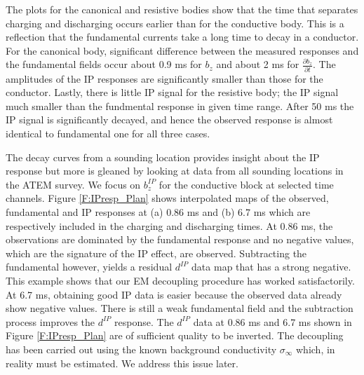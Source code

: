 \documentclass[a4paper, 11pt]{article}
\newcommand{\siginf}{\sigma_\infty}
\newcommand{\dip}{d^{IP}}
\begin{document}
The plots for the canonical and resistive bodies show that the time that separates charging and discharging occurs earlier than for the conductive body. This is a reflection that the fundamental currents take a long time to decay in a conductor. For the canonical body, significant difference between the measured responses and the fundamental fields occur about 0.9 ms for $b_z$ and about 2 ms for $\frac{\partial b_z}{\partial t}$. The amplitudes of the IP responses are significantly smaller than those for the conductor.  Lastly, there is little IP signal for the resistive body; the IP signal much smaller than the fundmental response in given time range. After 50 ms the IP signal is significantly decayed, and hence the observed response is almost identical to fundamental one for all three cases. 

The decay curves from a sounding location  provides insight about the IP response but more is gleaned by looking at data from all  sounding locations in the ATEM survey. We focus on $b_z^{IP}$ for the conductive block at selected time channels. Figure \ref{F:IPresp_Plan} shows interpolated maps of the observed, fundamental and IP responses at (a) 0.86 ms and (b) 6.7 ms which are respectively included in the charging and discharging times. 
At 0.86 ms, the observations are dominated by the fundamental response and no negative values,  which are the signature of the IP effect, are observed. Subtracting the fundamental however, yields a residual $\dip$ data map that has a strong negative. This  example  shows that our EM decoupling procedure has worked satisfactorily.  At 6.7 ms, obtaining good IP data is easier because the observed data already show negative values. There is still a weak fundamental field and the subtraction process improves the $\dip$ response. The $\dip$ data at  0.86 ms and 6.7 ms shown in Figure \ref{F:IPresp_Plan} are of sufficient quality to be inverted. The decoupling has been carried out using the known background conductivity $\siginf$ which, in reality must be estimated. We address this issue later. 
\end{document}
